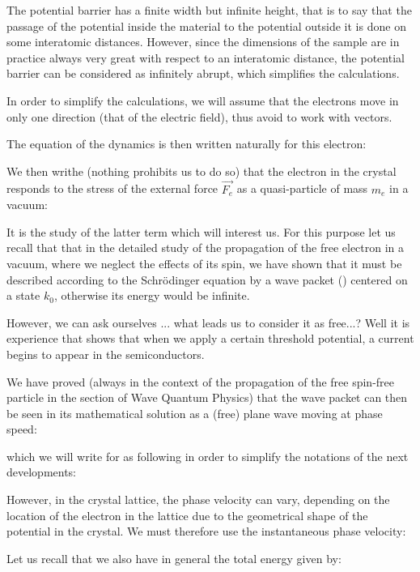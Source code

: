 	The potential barrier has a finite width but infinite height, that is to say that the passage of the potential inside the material to the potential outside it is done on some interatomic distances. However, since the dimensions of the sample are in practice always very great with respect to an interatomic distance, the potential barrier can be considered as infinitely abrupt, which simplifies the calculations.
	\begin{tcolorbox}[title=Remark,colframe=black,arc=10pt]
	In order to simplify the calculations, we will assume that the electrons move in only one direction (that of the electric field), thus avoid to work with vectors.
	\end{tcolorbox}
	The equation of the dynamics is then written naturally for this electron:
	
	We then writhe (nothing prohibits us to do so) that the electron in the crystal responds to the stress of the external force $\vec{F_e}$ as a quasi-particle of mass $m_e$ in a vacuum:
	
	It is the study of the latter term which will interest us. For this purpose let us recall that that in the detailed study of the propagation of the free electron in a vacuum, where we neglect the effects of its spin, we have shown that it must be described according to the Schrödinger equation by a wave packet () centered on a state $k_0$, otherwise its energy would be infinite.

	However, we can ask ourselves ... what leads us to consider it as free...? Well it is experience that shows that when we apply a certain threshold potential, a current begins to appear in the semiconductors.

	We have proved (always in the context of the propagation of the free spin-free particle in the section of Wave Quantum Physics) that the wave packet can then be seen in its mathematical solution as a (free) plane wave moving at phase speed:
	
	which we will write for as following in order to simplify the notations of the next developments:
	
	However, in the crystal lattice, the phase velocity can vary, depending on the location of the electron in the lattice due to the geometrical shape of the potential in the crystal. We must therefore use the instantaneous phase velocity:
	
	Let us recall that we also have in general the total energy given by:
	
